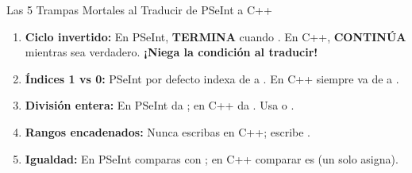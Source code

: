 \documentclass[10pt,letterpaper]{article}
\begin{document}
\vspace{-6pt}
\begin{peligro}{Las 5 Trampas Mortales al Traducir de PSeInt a C++}
\scriptsize
\begin{enumerate}[leftmargin=12pt,itemsep=1.5pt]
  \item \textbf{Ciclo invertido:} En PSeInt,  \textbf{TERMINA} cuando . En C++,  \textbf{CONTINÚA} mientras sea verdadero. \textbf{¡Niega la condición al traducir!}
  \item \textbf{Índices 1 vs 0:} PSeInt por defecto indexa de  a . En C++ siempre va de  a .
  \item \textbf{División entera:} En PSeInt  da ; en C++  da . Usa  o .
  \item \textbf{Rangos encadenados:} Nunca escribas  en C++; escribe .
  \item \textbf{Igualdad:} En PSeInt comparas con \codigo{=}; en C++ comparar es \codigo{==} (un solo \codigo{=} asigna).
\end{enumerate}
\end{peligro}
\end{document}
